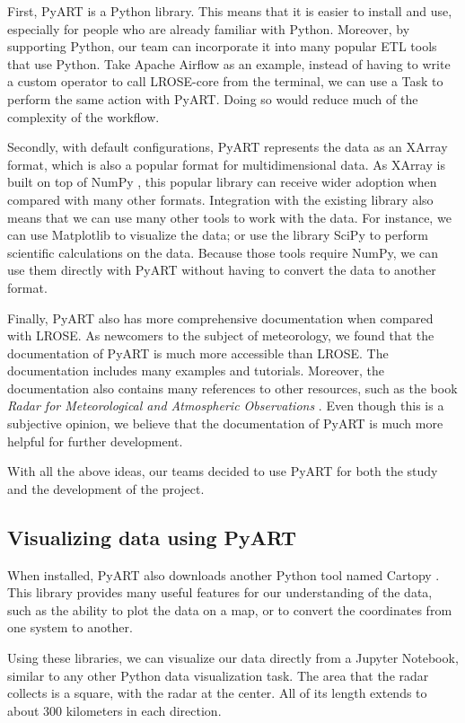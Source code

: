 First, PyART is a Python library.
This means that it is easier to install and use, especially for people who are already familiar with Python.
Moreover, by supporting Python, our team can incorporate it into many popular ETL tools that use Python.
Take Apache Airflow as an example, instead of having to write a custom operator to call LROSE-core from the terminal,
we can use a Task to perform the same action with PyART. Doing so would reduce much of the complexity of the workflow.

Secondly, with default configurations, PyART represents the data as an XArray \cite{hoyer2017xarray} format,
which is also a popular format for multidimensional data. As XArray is built on top of NumPy \cite{harris2020array},
this popular library can receive wider adoption when compared with many other formats.
Integration with the existing library also means that we can use many other tools to work with the data.
For instance, we can use Matplotlib to visualize the data;
or use the library SciPy \cite{2020SciPy-NMeth} to perform scientific calculations on the data. Because those tools require NumPy,
we can use them directly with PyART without having to convert the data to another format.

Finally, PyART also has more comprehensive documentation when compared with LROSE.
As newcomers to the subject of meteorology, we found that the documentation of PyART is much more accessible than LROSE.
The documentation includes many examples and tutorials. Moreover, the documentation also contains many references to other resources,
such as the book \textit{Radar for Meteorological and Atmospheric Observations} \cite{2022Weather}.
Even though this is a subjective opinion, we believe that the documentation of PyART is much more helpful for further development.

With all the above ideas, our teams decided to use PyART for both the study and the development of the project.

\subsection{Visualizing data using PyART}
When installed, PyART also downloads another Python tool named Cartopy \cite{Cartopy}. This library provides many useful features
for our understanding of the data, such as the ability to plot the data on a map, or to convert the coordinates from one system to another.

Using these libraries, we can visualize our data directly from a Jupyter Notebook, similar to any other Python data visualization task.
The area that the radar collects is a square, with the radar at the center. All of its length extends to about 300 kilometers in each direction.

